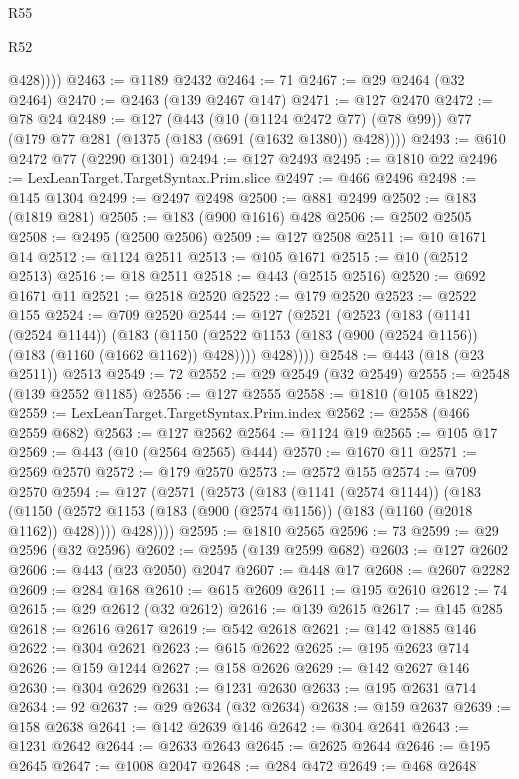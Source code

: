 \begin{lexlean}{R55}
\begin{lexlean}{R52}
\begin{coremodule}
{{{{{{{{{{{{{{{{{{{{{{{{{{{{{{{{{{{{{{{{{{{{{{{{{{{{{{{{{{{{{{{{{{{{{{{{{{{{{{{{{{{{{{{{{{{{{{{{{{{{{{{{{{{{{{{{{{{{{{{{{{{{{{{{{{{{{{{{{{{{{{{{{{{{{{{{{{{{{{{{{{{{{{{{{{{{{{{{{{{{{{{{{{{{{{{{{{{{{{            @428))))
@2463 := @1189 @2432
@2464 := 71
@2467 := @29 @2464 (@32 @2464)
@2470 := @2463 (@139 @2467 @147)
@2471 := @127 @2470
@2472 := @78 @24
@2489 := @127
    (@443
      (@10 (@1124 @2472 @77) (@78 @99))
      @77
      (@179 @77 @281 (@1375 (@183 (@691 (@1632 @1380)) @428))))
@2493 := @610 @2472 @77 (@2290 @1301)
@2494 := @127 @2493
@2495 := @1810 @22
@2496 := LexLeanTarget.TargetSyntax.Prim.slice
@2497 := @466 @2496
@2498 := @145 @1304
@2499 := @2497 @2498
@2500 := @881 @2499
@2502 := @183 (@1819 @281)
@2505 := @183 (@900 @1616) @428
@2506 := @2502 @2505
@2508 := @2495 (@2500 @2506)
@2509 := @127 @2508
@2511 := @10 @1671 @14
@2512 := @1124 @2511
@2513 := @105 @1671
@2515 := @10 (@2512 @2513)
@2516 := @18 @2511
@2518 := @443 (@2515 @2516)
@2520 := @692 @1671 @11
@2521 := @2518 @2520
@2522 := @179 @2520
@2523 := @2522 @155
@2524 := @709 @2520
@2544 := @127
    (@2521
      (@2523
        (@183
          (@1141 (@2524 @1144))
          (@183
            (@1150 (@2522 @1153 (@183 (@900 (@2524 @1156)) (@183 (@1160 (@1662 @1162)) @428))))
            @428))))
@2548 := @443 (@18 (@23 @2511)) @2513
@2549 := 72
@2552 := @29 @2549 (@32 @2549)
@2555 := @2548 (@139 @2552 @1185)
@2556 := @127 @2555
@2558 := @1810 (@105 @1822)
@2559 := LexLeanTarget.TargetSyntax.Prim.index
@2562 := @2558 (@466 @2559 @682)
@2563 := @127 @2562
@2564 := @1124 @19
@2565 := @105 @17
@2569 := @443 (@10 (@2564 @2565) @444)
@2570 := @1670 @11
@2571 := @2569 @2570
@2572 := @179 @2570
@2573 := @2572 @155
@2574 := @709 @2570
@2594 := @127
    (@2571
      (@2573
        (@183
          (@1141 (@2574 @1144))
          (@183
            (@1150 (@2572 @1153 (@183 (@900 (@2574 @1156)) (@183 (@1160 (@2018 @1162)) @428))))
            @428))))
@2595 := @1810 @2565
@2596 := 73
@2599 := @29 @2596 (@32 @2596)
@2602 := @2595 (@139 @2599 @682)
@2603 := @127 @2602
@2606 := @443 (@23 @2050) @2047
@2607 := @448 @17
@2608 := @2607 @2282
@2609 := @284 @168
@2610 := @615 @2609
@2611 := @195 @2610
@2612 := 74
@2615 := @29 @2612 (@32 @2612)
@2616 := @139 @2615
@2617 := @145 @285
@2618 := @2616 @2617
@2619 := @542 @2618
@2621 := @142 @1885 @146
@2622 := @304 @2621
@2623 := @615 @2622
@2625 := @195 @2623 @714
@2626 := @159 @1244
@2627 := @158 @2626
@2629 := @142 @2627 @146
@2630 := @304 @2629
@2631 := @1231 @2630
@2633 := @195 @2631 @714
@2634 := 92
@2637 := @29 @2634 (@32 @2634)
@2638 := @159 @2637
@2639 := @158 @2638
@2641 := @142 @2639 @146
@2642 := @304 @2641
@2643 := @1231 @2642
@2644 := @2633 @2643
@2645 := @2625 @2644
@2646 := @195 @2645
@2647 := @1008 @2047
@2648 := @284 @472
@2649 := @468 @2648
}}}}}}}}}}}}}}}}}}}}}}}}}}}}}}}}}}}}}}}}}}}}}}}}}}}}}}}}}}}}}}}}}}}}}}}}}}}}}}}}}}}}}}}}}}}}}}}}}}}}}}}}}}}}}}}}}}}}}}}}}}}}}}}}}}}}}}}}}}}}}}}}}}}}}}}}}}}}}}}}}}}}}}}}}}}}}}}}}}}}}}}}}}}}}}}}}}}}}}
\end{coremodule}
\end{lexlean}
\end{lexlean}
